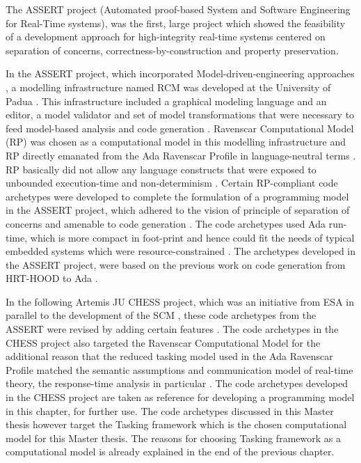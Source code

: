 The ASSERT project (Automated proof-based System and Software Engineering for Real-Time systems), was the first, large project which showed the feasibility of a development approach for high-integrity real-time systems centered on separation of concerns, correctness-by-construction and property preservation.

In the ASSERT project, which incorporated Model-driven-engineering approaches \cite{PhdThesis}, a modelling infrastructure named RCM was developed at the University of Padua \cite{ScheduAnaly}. This infrastructure included a graphical modeling language and an editor, a model validator and set of model transformations that were necessary to feed model-based analysis and code generation \cite{ScheduAnaly}. Ravenscar Computational Model (RP) was chosen as a computational model in this modelling infrastructure and RP directly emanated from the Ada Ravenscar Profile in language-neutral terms \cite{EvoRAVCodeAr}. RP basically did not allow any language constructs that were exposed to unbounded execution-time and non-determinism \cite{CharEvoRAVCodeAr,EvoRAVCodeAr,RAVCodeAr}. Certain RP-compliant code archetypes were developed to complete the formulation of a programming model in the ASSERT project, which adhered to the vision of principle of separation of concerns and amenable to code generation \cite{CharEvoRAVCodeAr}. The code archetypes used Ada run-time, which is more compact in foot-print and hence could fit the needs of typical embedded systems which were resource-constrained \cite{RAVCodeAr}. The archetypes developed in the ASSERT project, were based on the previous work on code generation from HRT-HOOD to Ada \cite{CharEvoRAVCodeAr,EvoRAVCodeAr}.

In the following Artemis JU CHESS project, which was an initiative from ESA in parallel to the development of the SCM \cite{PhdThesis,CompBasedProcess}, these code archetypes from the ASSERT were revised by adding certain features \cite{EvoRAVCodeAr}. The code archetypes in the CHESS project also targeted the Ravenscar Computational Model for the additional reason that the reduced tasking model used in the Ada Ravenscar Profile matched the semantic assumptions and communication model of real-time theory, the response-time analysis in particular \cite{CharEvoRAVCodeAr}. The code archetypes developed in the CHESS project \cite{EvoRAVCodeAr} are taken as reference for developing a programming model in this chapter, for further use. The code archetypes discussed in this Master thesis however target the Tasking framework which is the chosen computational model for this Master thesis. The reasons for choosing Tasking framework as a computational model is already explained in the end of the previous chapter.

